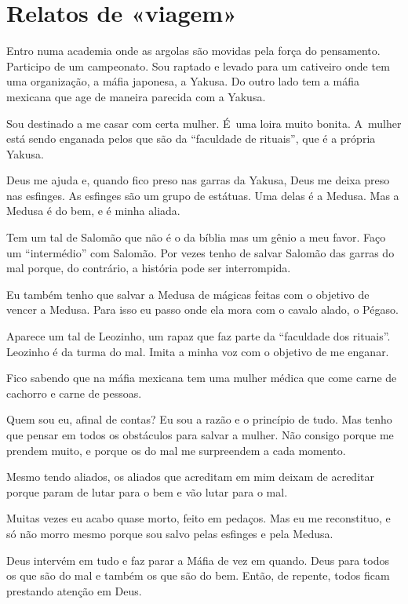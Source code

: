  

\section*{Relatos de «viagem»}

Entro numa academia onde as argolas são movidas pela força do
pensamento. Participo de um campeonato. Sou raptado e levado para um
cativeiro onde tem uma organização, a máfia japonesa, a Yakusa. Do outro
lado tem a máfia mexicana que age de maneira parecida com a Yakusa.

Sou destinado a me casar com certa mulher. É~uma loira muito bonita. A~mulher está sendo enganada pelos que são da ``faculdade de rituais'',
que é a própria Yakusa.

Deus me ajuda e, quando fico preso nas garras da Yakusa, Deus me deixa
preso nas esfinges. As esfinges são um grupo de estátuas. Uma delas é a
Medusa. Mas a Medusa é do bem, e é minha aliada.

Tem um tal de Salomão que não é o da bíblia mas um gênio a meu favor.
Faço um ``intermédio'' com Salomão. Por vezes tenho de salvar Salomão
das garras do mal porque, do contrário, a história pode ser interrompida.

Eu também tenho que salvar a Medusa de mágicas feitas com o objetivo de
vencer a Medusa. Para isso eu passo onde ela mora com o cavalo alado, o
Pégaso.

Aparece um tal de Leozinho, um rapaz que faz parte da ``faculdade dos
rituais''. Leozinho é da turma do mal. Imita a minha voz com o objetivo
de me enganar.

Fico sabendo que na máfia mexicana tem uma mulher médica que come carne
de cachorro e carne de pessoas.

Quem sou eu, afinal de contas? Eu sou a razão e o princípio de tudo. Mas
tenho que pensar em todos os obstáculos para salvar a mulher. Não
consigo porque me prendem muito, e porque os do mal me surpreendem a
cada momento.

Mesmo tendo aliados, os aliados que acreditam em mim deixam de acreditar
porque param de lutar para o bem e vão lutar para o mal.

Muitas vezes eu acabo quase morto, feito em pedaços. Mas eu me
reconstituo, e só não morro mesmo porque sou salvo pelas esfinges e pela
Medusa.

Deus intervém em tudo e faz parar a Máfia de vez em quando. Deus para
todos os que são do mal e também os que são do bem. Então, de repente,
todos ficam prestando atenção em Deus.

